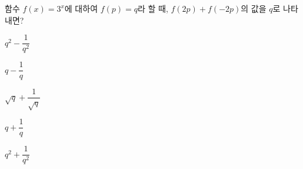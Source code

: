 함수 $f(x)=3^{x}$에 대하여 $f(p)=q$라 할 때, $f(2p)+f(-2p)$의 값을 $q$로 나타내면?
\begin{choices32}{\rule[-3ex]{0pt}{8ex}$q^{2}-\dfrac{1}{q^{2}}$}{\rule[-3ex]{0pt}{8ex}$q-\dfrac{1}{q}$}{\rule[-3ex]{0pt}{8ex}$\sqrt{q}+\dfrac{1}{\sqrt{q}}$}{\rule[-3ex]{0pt}{8ex}$q+\dfrac{1}{q}$}{\rule[-3ex]{0pt}{8ex}$q^{2}+\dfrac{1}{q^{2}}$}\end{choices32}
